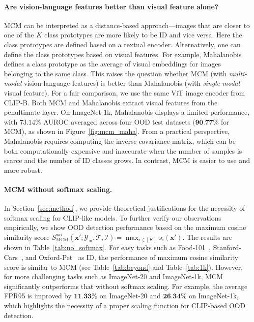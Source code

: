 \documentclass{article}
\def\*#1{\mathbf{#1}}
\begin{document}
\paragraph{Are vision-language features better than visual feature alone?}
MCM can be interpreted as a distance-based approach---images that are closer to one of the $K$ class prototypes are more likely to be ID and vice versa. Here the class prototypes are defined based on a textual encoder. Alternatively, one can define the class prototypes based on visual features. For example, Mahalanobis~\cite{lee2018simple} defines a class prototype as the average of visual embeddings for images belonging to the same class. This raises the question whether MCM (with \emph{multi-modal} vision-language features) is better than Mahalanobis (with \emph{single-modal} visual feature). For a fair comparison, we use the same ViT image encoder from CLIP-B. Both MCM and Mahalanobis extract visual features from the penultimate layer. On ImageNet-1k, Mahalanobis displays a limited performance, with $73.14\%$ AUROC averaged across four OOD test datasets ($\textbf{90.77\%}$ for MCM), as shown in Figure~\ref{fig:mcm_maha}. From a practical perspective, Mahalanobis requires computing the inverse covariance matrix, which can be both computationally expensive and inaccurate when the number of samples is scarce and the number of ID classes grows.
{In contrast, MCM is easier to use and more robust.}

\paragraph{MCM without softmax scaling.}
In Section~\ref{sec:method}, we provide theoretical justifications for the necessity of softmax scaling for CLIP-like models. To further verify our observations empirically, we show OOD detection performance based on the maximum cosine similarity score $S_{\text{MCM}}^{\text{wo}}(\*x';\mathcal{Y}_\text{in},\mathcal{T},\mathcal{I}) = \max_{i\in[K]} s_i(\*x')$. The results are shown in Table~\ref{tab:no_softmax}. For easy tasks such as Food-101~\cite{KrauseStarkDengFei-Fei_3DRR2013}, Stanford-Cars~\cite{KrauseStarkDengFei-Fei_3DRR2013}, and Oxford-Pet~\cite{parkhi12a} as ID, the performance of maximum cosine similarity score is similar to MCM (see Table~\ref{tab:beyond} and Table~\ref{tab:1k}). However, for more challenging tasks such as ImageNet-20 and ImageNet-1k, MCM significantly outperforms that without softmax scaling. For example, the average FPR95 is improved by $\textbf{11.33\%}$ on ImageNet-20 and $\textbf{26.34\%}$ on ImageNet-1k, which highlights the necessity of a proper scaling function for CLIP-based OOD detection.
\end{document}
